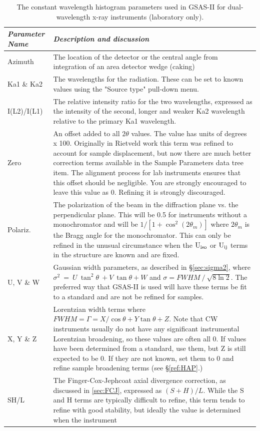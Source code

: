 \begin{table}
\centering
\caption{The constant wavelength histogram parameters used in GSAS-II for dual-wavelength x-ray instruments (laboratory only).}
\label{tab:CWprofile2}
\begin{tabular}{| l | p{} |}
\hline
\textit{Parameter Name} & \textit{Description and discussion} \\
\hline
Azimuth & The location of the detector or the central angle from integration of an area detector wedge (caking)\\
\hline
Ka1 \& Ka2 & The wavelengths for the radiation. These can be set to known values using the "Source type" pull-down menu. \\
\hline
I(L2)/I(L1) & The relative intensity ratio for the two wavelengths, expressed as the intensity of the second, longer and weaker Ka2 wavelength relative to the primary Ka1 wavelength. \\
\hline
Zero & An offset added to all $2\theta$ values. The value has units of degrees x 100. 
Originally in Rietveld work this term was refined to account for sample displacement, but now there are much better correction terms available in the Sample Parameters data tree item. 
The alignment process for lab instruments ensures that this offset should be negligible. You are strongly encouraged to leave this value as 0. Refining it is strongly discouraged.\\
\hline
Polariz. & The polarization of the beam in the diffraction plane vs. the perpendicular plane. This will be 0.5 for instruments without a monochromator and will be $1 / [1 + \cos^2(2\theta_m)]$ where $2\theta_m$ is the Bragg angle for the monochromator. This can only be refined in the unusual circumstance when the $\rm U_{iso}$ or $\rm U_{ij}$ terms in the structure are known and are fixed. \\
\hline
U, V \& W & Gaussian width parameters, as described in \S\ref{sec:sigma2}, where $\sigma^2\ =\ U\ \tan^2{\theta}\ +V\ \tan{\theta}+W$ and $\sigma=FWHM\ /\ \sqrt{8\ln{2}}$. The preferred way that GSAS-II is used will have these terms be fit to a standard and are not be refined for samples.\\
\hline
X, Y \& Z & Lorentzian width terms where $FWHM = \Gamma = X / \cos\theta + Y \tan\theta + Z$. Note that CW instruments usually do not have any significant instrumental Lorentzian broadening, so these values are often all 0.
If values have been determined from a standard, use them, but Z is still expected to be 0. If they are not known, set them to 0 and refine sample broadening terms (see \S\ref{ref:HAP}.)
\\
\hline
SH/L & The Finger-Cox-Jephcoat axial divergence correction, as discussed in \ref{sec:FCJ}, expressed as $(S+H)/L$. While the S and H terms are typically difficult to refine, this term tends to refine with good stability, but ideally the value is determined when the instrument \\
\hline
\end{tabular}
\end{table}


